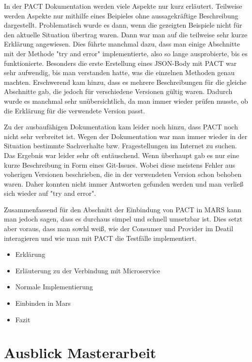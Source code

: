 \documentclass{llncs}
\begin{document}
In der PACT Dokumentation werden viele Aspekte nur kurz erläutert. Teilweise werden Aspekte nur mithilfe eines Beipieles ohne aussagekräftige Beschreibung dargestellt. Problematisch wurde es dann, wenn die gezeigten Beispiele nicht für den aktuelle Situation übertrag waren. Dann war man auf die teilweise sehr kurze Erklärung angewiesen. Dies führte manchmal dazu, dass man einige Abschnitte mit der Methode "try and error" implementierte, also so lange ausprobierte, bis es funktionierte. Besonders die erste Erstellung eines JSON-Body mit PACT war sehr aufwendig, bis man verstanden hatte, was die einzelnen Methoden genau machten. Erschwerend kam hinzu, dass es mehrere Beschreibungen für die gleiche Abschnitte gab, die jedoch für verschiedene Versionen gültig waren. Dadurch wurde es manchmal sehr unübersichtlich, da man immer wieder prüfen musste, ob die Erklärung für die verwendete Version passt.

Zu der ausbaufähigen Dokumentation kam leider noch hinzu, dass PACT noch nicht sehr verbreitet ist. Wegen der Dokumentation war man immer wieder in der Situation bestimmte Sachverhalte bzw. Fragestellungen im Internet zu suchen. Das Ergebnis war leider sehr oft entäuschend. Wenn überhaupt gab es nur eine kurze Beschreibung in Form eines Git-Issues. Wobei diese meistens Fehler aus voherigen Versionen beschrieben, die in der verwendeten Version schon behoben waren. Daher konnten nicht immer Antworten gefunden werden und man verließ sich wieder auf "try and error".

Zusammenfassend für den Abschnitt der Einbindung von PACT in MARS kann man jedoch sagen, dass es durchaus simpel und schnell umsetzbar ist. Dies setzt aber voraus, dass man sowhl weiß, wie der Consumer und Provider im Deatil interagieren und wie man mit PACT die Testfälle implementiert.

 

\begin{itemize}
\item Erklärung
\item Erläuterung zu der Verbindung mit Microservice
\item Normale Implementierung
\item Einbinden in Mars
\item Fazit
\end{itemize}
\section{Ausblick Masterarbeit}





\end{document}
